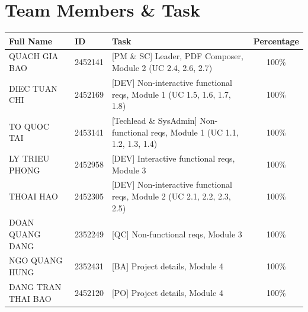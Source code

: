 \section*{Team Members \& Task}
\normalsize
\begin{table}[h!]
  \centering
  \begin{tabularx}{\textwidth}{llXc}
    \hline
    \textbf{Full Name} & \textbf{ID} & \textbf{Task} & \textbf{Percentage} \\
    \hline
    QUACH GIA BAO      & 2452141 & [PM \& SC] Leader, PDF Composer, Module 2 (UC 2.4, 2.6, 2.7) & 100\% \\
    DIEC TUAN CHI      & 2452169 & [DEV] Non-interactive functional reqs, Module 1 (UC 1.5, 1.6, 1.7, 1.8) & 100\% \\
    TO QUOC TAI        & 2453141 & [Techlead \& SysAdmin] Non-functional reqs, Module 1 (UC 1.1, 1.2, 1.3, 1.4)& 100\% \\
    LY TRIEU PHONG     & 2452958 & [DEV] Interactive functional reqs, Module 3 & 100\% \\
    THOAI HAO          & 2452305 & [DEV] Non-interactive functional reqs, Module 2 (UC 2.1, 2.2, 2.3, 2.5)& 100\% \\
    DOAN QUANG DANG    & 2352249 & [QC] Non-functional reqs, Module 3 & 100\% \\
    NGO QUANG HUNG     & 2352431 & [BA] Project details, Module 4& 100\% \\
    DANG TRAN THAI BAO & 2452120 & [PO] Project details, Module 4& 100\% \\
    \hline
  \end{tabularx}
  \label{tab:students_tasks}
\end{table}